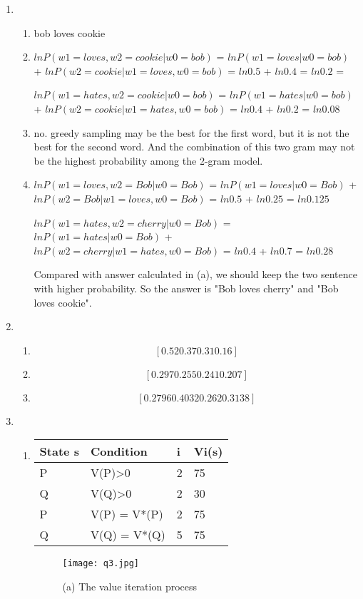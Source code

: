 \documentclass[12pt]{article}
\begin{document}
\begin{enumerate}
\item
\begin{enumerate}
\item bob loves cookie
\item 
$lnP(w1 = loves, w2 = cookie | w0 = bob)$ = $lnP(w1 = loves | w0 = bob)$ +  $lnP(w2 = cookie | w1 = loves, w0 = bob)$
= $ln0.5$ + $ln0.4$ = $ln0.2$ = 

$lnP(w1 = hates, w2 = cookie | w0 = bob)$ = $lnP(w1 = hates | w0 = bob)$ +  $lnP(w2 = cookie | w1 = hates, w0 = bob)$
= $ln0.4$ + $ln0.2$ = $ln0.08$

\item no. greedy sampling may be the best for the first word, but it is not the best for the second word. And the combination of this two gram may not be the highest probability among the 2-gram model.
\item $lnP(w1 = loves, w2 = Bob | w0 = Bob)$ = $lnP(w1 = loves | w0 = Bob)$ +  $lnP(w2 = Bob | w1 = loves, w0 = Bob)$
 = $ln0.5$ + $ln0.25$ = $ln0.125$

$lnP(w1 = hates, w2 = cherry | w0 = Bob)$ = $lnP(w1 = hates | w0 = Bob)$ +  $lnP(w2 = cherry | w1 = hates, w0 = Bob)$
 = $ln0.4$ + $ln0.7$ = $ln0.28$

Compared with answer calculated in (a), we should keep the two sentence with higher probability. So the answer is "Bob loves cherry" and "Bob loves cookie".

\end{enumerate}

\item
  \begin{enumerate}
  \item $$[0.52 0.37 0.31 0.16]$$
  \item $$ [0.297 0.255 0.241 0.207] $$
  \item $$ [0.2796 0.4032 0.262  0.3138] $$
  \end{enumerate}
  \item
  \begin{enumerate}
    \item 
    \begin{tabular}{llll}
    \hline
    State s & Condition           & i & Vi(s) \\ \hline
    P       & V(P)\textgreater{}0 & 2  & 75      \\
    Q       & V(Q)\textgreater{}0 & 2  & 30      \\
    P       & V(P) = V*(P)        & 2  & 75      \\
    Q       & V(Q) = V*(Q)        & 5  & 75     
    \end{tabular}
    \begin{figure}[h]
    \centering
    \texttt{[image: q3.jpg]}
    \caption{(a) The value iteration process}
    \label{fig:hw6_1}
    \end{figure}


\end{enumerate}
\end{enumerate}
\end{document}
